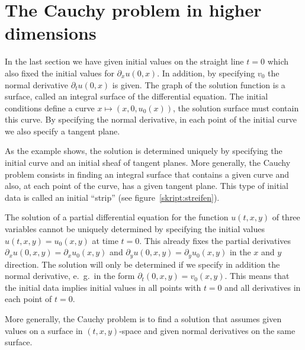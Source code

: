 %
%
%
\section{The Cauchy problem in higher dimensions}
In the last section we have given initial values on the straight line
$t=0$ which also fixed the initial values for $\partial_x u(0,x)$.
In addition, by specifying $v_0$ the normal derivative 
$\partial_t u(0,x)$ is given.
The graph of the solution function is a surface, called an integral
surface of the differential equation.
The initial conditions define a curve $x\mapsto(x,0,u_0(x))$,
the solution surface must contain this curve.
By specifying the normal derivative, in each point of the initial
curve we also specify a tangent plane.

As the example shows, the solution is determined uniquely by specifying
the initial curve and an initial sheaf of tangent planes.
More generally, the Cauchy problem consists in finding an integral
surface that contains a given curve and also, at each point of the curve,
has a given tangent plane.
This type of initial data is called an initial ``strip''
(see figure~\ref{skript:streifen}).

The solution of a partial differential equation for the function $u(t,x,y)$
of three variables cannot be uniquely determined by specifying
the initial values $u(t,x,y)=u_0(x,y)$ at time $t=0$.
This already fixes the partial derivatives
$\partial_x u(0,x,y)=\partial_xu_0(x,y)$
and $\partial_y u(0,x,y)=\partial_y u_0(x,y)$
in the $x$ and $y$ direction.
The solution will only be determined if we specify in addition the normal
derivative, e.~g.~in the form
$\partial_t(0,x,y)=v_0(x,y)$.
This means that the initial data implies initial values in all points
with $t=0$ 
and all derivatives in each point of $t=0$.

More generally, the Cauchy problem is to find a solution that assumes
given values on a surface in $(t,x,y)$-space and 
given normal derivatives on the same surface.

